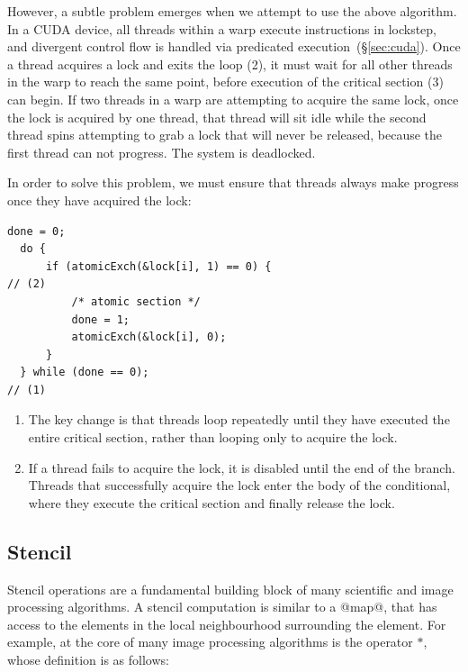 
However, a subtle problem emerges when we attempt to use the above algorithm. In
a CUDA device, all threads within a warp execute instructions in lockstep, and
divergent control flow is handled via predicated execution~(\S\ref{sec:cuda}).
Once a thread acquires a lock and exits the loop (2), it must wait for all other
threads in the warp to reach the same point, before execution of the critical
section (3) can begin. If two threads in a warp are attempting to acquire the
same lock, once the lock is acquired by one thread, that thread will sit idle
while the second thread spins attempting to grab a lock that will never be
released, because the first thread can not progress. The system is deadlocked.

In order to solve this problem, we must ensure that threads always make progress
once they have acquired the lock:
%
\begin{lstlisting}[style=cuda]
  done = 0;
  do {
      if (atomicExch(&lock[i], 1) == 0) {                                          // (2)
          /* atomic section */
          done = 1;
          atomicExch(&lock[i], 0);
      }
  } while (done == 0);                                                             // (1)
\end{lstlisting}
%
\begin{enumerate}
    \item The key change is that threads loop repeatedly until they have
        executed the entire critical section, rather than looping only to
        acquire the lock.

    \item If a thread fails to acquire the lock, it is disabled until the end of
        the branch. Threads that successfully acquire the lock enter the body of
        the conditional, where they execute the critical section and finally
        release the lock.
\end{enumerate}



\subsection{Stencil}
\label{sec:parallel_stencil}

Stencil operations are a fundamental building block of many scientific and image
processing algorithms. A stencil computation is similar to a @map@, that has
access to the elements in the local neighbourhood surrounding the element. For
example, at the core of many image processing algorithms is the
 operator $*$, whose definition is as follows:


